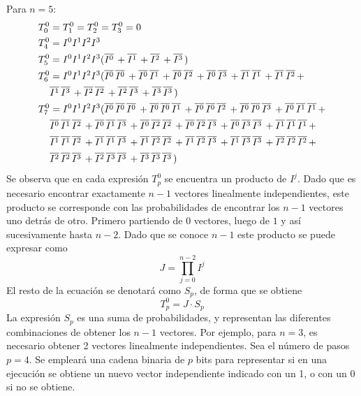 %
Para $n=5$:
%
\begin{equation}
\begin{split}
	T^0_0 &= T^0_1 = T^0_2 = T^0_3 = 0 \\
%
	T^0_4 &= I^0I^1I^2I^3 \\
%
	T^0_5 &= I^0I^1I^2I^3 (\NI 0 + \NI 1 + \NI 2 + \NI 3) \\
%
	T^0_6 &= I^0I^1I^2I^3 (
		\NI 0 \NI 0 +
		\NI 0 \NI 1 +
		\NI 0 \NI 2 +
		\NI 0 \NI 3 +
		\NI 1 \NI 1 +
		\NI 1 \NI 2 +\\
&		\NI	1 \NI 3 +
		\NI 2 \NI 2 +
		\NI 2 \NI 3 +
		\NI 3 \NI 3) \\
%
	T^0_7 &= I^0I^1I^2I^3 (
		\NI 0 \NI 0 \NI 0 +
		\NI 0 \NI 0 \NI 1 +
		\NI 0 \NI 0 \NI 2 +
		\NI 0 \NI 0 \NI 3 +
		\NI 0 \NI 1 \NI 1 +
\\&	\NI 0 \NI 1 \NI 2 +
		\NI 0 \NI 1 \NI 3 +
		\NI 0 \NI 2 \NI 2 +
		\NI 0 \NI 2 \NI 3 +
		\NI 0 \NI 3 \NI 3 +
		\NI 1 \NI 1 \NI 1 +
\\&	\NI 1 \NI 1 \NI 2 +
		\NI 1 \NI 1 \NI 3 +
		\NI 1 \NI 2 \NI 2 +
		\NI 1 \NI 2 \NI 3 +
		\NI 1 \NI 3 \NI 3 +
		\NI 2 \NI 2 \NI 2 +
\\&	\NI 2 \NI 2 \NI 3 +
		\NI 2 \NI 3 \NI 3 +
		\NI 3 \NI 3 \NI 3) \\
\end{split}
\end{equation}
%
Se observa que en cada expresión $T_p^0$ se encuentra un producto de $I^j$. Dado 
que es necesario encontrar exactamente $n-1$ vectores linealmente 
independientes, este producto se corresponde con las probabilidades de encontrar 
los $n-1$ vectores uno detrás de otro. Primero partiendo de $0$ vectores, luego 
de $1$ y así sucesivamente hasta $n-2$. Dado que se conoce $n-1$ este producto 
se puede expresar como
$$
	J =\prod^{n-2}_{j=0} I^j
$$
%
El resto de la ecuación se denotará como $S_p$, de forma que se obtiene
$$
	T^0_p = J \cdot S_p
$$
%
La expresión $S_p$ es una suma de probabilidades, y representan las diferentes 
combinaciones de obtener los $n-1$ vectores. Por ejemplo, para $n=3$, es 
necesario obtener 2 vectores linealmente independientes. Sea el número de pasos 
$p = 4$. Se empleará una cadena binaria de $p$ bits para representar si en una 
ejecución se obtiene un nuevo vector independiente indicado con un 1, o con un 0 
si no se obtiene.

